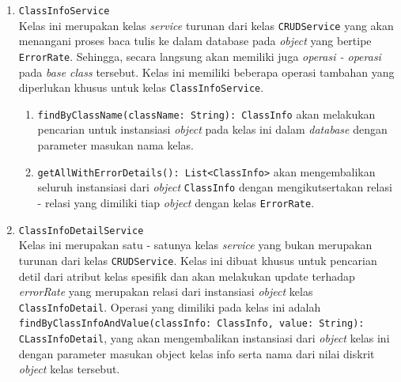 \begin{enumerate}
	\item \texttt{ClassInfoService}\\
	Kelas ini merupakan kelas \textit{service} turunan dari kelas \texttt{CRUDService} yang akan menangani proses baca tulis ke dalam database pada \textit{object} yang bertipe \texttt{ErrorRate}. Sehingga, secara langsung akan memiliki juga \textit{operasi - operasi} pada \textit{base class} tersebut. Kelas ini memiliki beberapa operasi tambahan yang diperlukan khusus untuk kelas \texttt{ClassInfoService}.
	\begin{enumerate}
		\item \texttt{findByClassName(className: String): ClassInfo} akan melakukan pencarian untuk instansiasi \textit{object} pada kelas ini dalam \textit{database} dengan parameter masukan nama kelas.
		\item \texttt{getAllWithErrorDetails(): List<ClassInfo>} akan mengembalikan seluruh instansiasi dari \textit{object} \texttt{ClassInfo} dengan mengikutsertakan relasi - relasi yang dimiliki tiap \textit{object} dengan kelas \texttt{ErrorRate}.
	\end{enumerate}
	
	\item \texttt{ClassInfoDetailService}\\
	Kelas ini merupakan satu - satunya kelas \textit{service} yang bukan merupakan turunan dari kelas \texttt{CRUDService}. Kelas ini dibuat khusus untuk pencarian detil dari atribut kelas spesifik dan akan melakukan update terhadap \textit{errorRate} yang merupakan relasi dari instansiasi \textit{object} kelas \texttt{ClassInfoDetail}. Operasi yang dimiliki pada kelas ini adalah \texttt{findByClassInfoAndValue(classInfo: ClassInfo, value: String): CLassInfoDetail}, yang akan mengembalikan instansiasi dari \textit{object} kelas ini dengan parameter masukan object kelas info serta nama dari nilai diskrit \textit{object} kelas tersebut. 

\end{enumerate}

